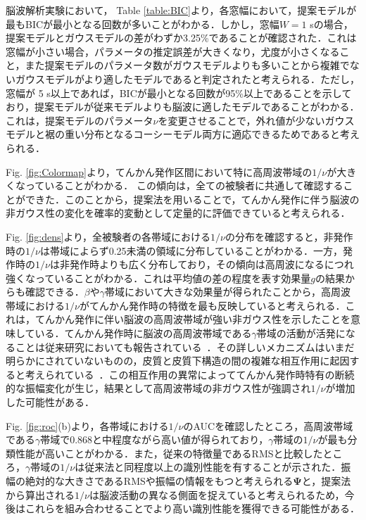 \documentclass[journal]{IEEEtran}
\begin{document}
脳波解析実験において，
Table \ref{table:BIC}より，各窓幅において，提案モデルが最もBICが最小となる回数が多いことがわかる．しかし，窓幅$W=1$ sの場合，提案モデルとガウスモデルの差がわずか3.25\%であることが確認された．これは窓幅が小さい場合，パラメータの推定誤差が大きくなり，尤度が小さくなること，また提案モデルのパラメータ数がガウスモデルよりも多いことから複雑でないガウスモデルがより適したモデルであると判定されたと考えられる．ただし，窓幅が 5 s以上であれば，BICが最小となる回数が95\%以上であることを示しており，提案モデルが従来モデルよりも脳波に適したモデルであることがわかる．これは，提案モデルのパラメータ$\nu$を変更させることで，外れ値が少ないガウスモデルと裾の重い分布となるコーシーモデル両方に適応できるためであると考えられる．

Fig. \ref{fig:Colormap}より，てんかん発作区間において特に高周波帯域の$1/\nu$が大きくなっていることがわかる．
この傾向は，全ての被験者に共通して確認することができた．このことから，提案法を用いることで，てんかん発作に伴う脳波の非ガウス性の変化を確率的変動として定量的に評価できていると考えられる．

Fig. \ref{fig:dens}より，全被験者の各帯域における$1/\nu$の分布を確認すると，非発作時の$1/\nu$は帯域によらず0.25未満の領域に分布していることがわかる．一方，発作時の$1/\nu$は非発作時よりも広く分布しており，その傾向は高周波になるにつれ強くなっていることがわかる．これは平均値の差の程度を表す効果量$g$の結果からも確認できる．$\beta$や$\gamma$帯域において大きな効果量が得られたことから，高周波帯域における$1/\nu$がてんかん発作時の特徴を最も反映していると考えられる．これは，てんかん発作に伴い脳波の高周波帯域が強い非ガウス性を示したことを意味している．てんかん発作時に脳波の高周波帯域である$\gamma$帯域の活動が活発になることは従来研究においても報告されている~\cite{Kobayashi2004,Kobayashi2009,Benedek2016}．その詳しいメカニズムはいまだ明らかにされていないものの，皮質と皮質下構造の間の複雑な相互作用に起因すると考えられている~\cite{Kobayashi2004}．この相互作用の異常によっててんかん発作時特有の断続的な振幅変化が生じ，結果として高周波帯域の非ガウス性が強調され$1/\nu$が増加した可能性がある．

Fig. \ref{fig:roc}(b)より，各帯域における$1/\nu$のAUCを確認したところ，高周波帯域である$\gamma$帯域で0.868と中程度ながら高い値が得られており，$\gamma$帯域の$1/\nu$が最も分類性能が高いことがわかる．また，従来の特徴量であるRMSと比較したところ，$\gamma$帯域の$1/\nu$は従来法と同程度以上の識別性能を有することが示された．振幅の絶対的な大きさであるRMSや振幅の情報をもつと考えられる$\mathbf{\Psi}$と，提案法から算出される$1/\nu$は脳波活動の異なる側面を捉えていると考えられるため，今後はこれらを組み合わせることでより高い識別性能を獲得できる可能性がある．
\end{document}
